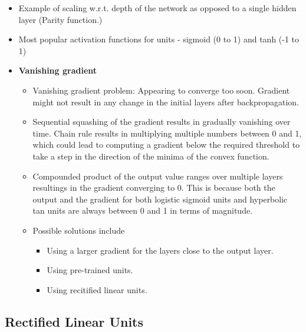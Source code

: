 \documentclass[parskip=half]{scrartcl}
\begin{document}
    \begin{itemize}
        \item 
        Example of scaling w.r.t. depth of the network as opposed to a single hidden layer (Parity function.)
        \item 
        Most popular activation functions for units - sigmoid (0 to 1) and tanh (-1 to 1)
        \item 
        \textbf{Vanishing gradient}
        \begin{itemize}
            \item 
            Vanishing gradient problem: Appearing to converge too soon. Gradient might not result in any change in the initial layers after backpropagation.
            \item 
            Sequential squashing of the gradient results in gradually vanishing over time. Chain rule results in multiplying multiple numbers between 0 and 1, which could lead to computing a gradient below the required threshold to take a step in the direction of the minima of the convex function.
            \item 
            Compounded product of the output value ranges over multiple layers resultings in the gradient converging to 0. This is because both the output and the gradient for both logistic sigmoid units and hyperbolic tan units are always between 0 and 1 in terms of magnitude.
            \item 
            Possible solutions include 
            \begin{itemize}
                \item 
                Using a larger gradient for the layers close to the output layer.
                \item 
                Using pre-trained units.
                \item 
                Using recitified linear units.
            \end{itemize}
        \end{itemize}
    \end{itemize}

    \subsection{Rectified Linear Units} %
    \label{sub:rectified_linear_units}
    
\end{document}
